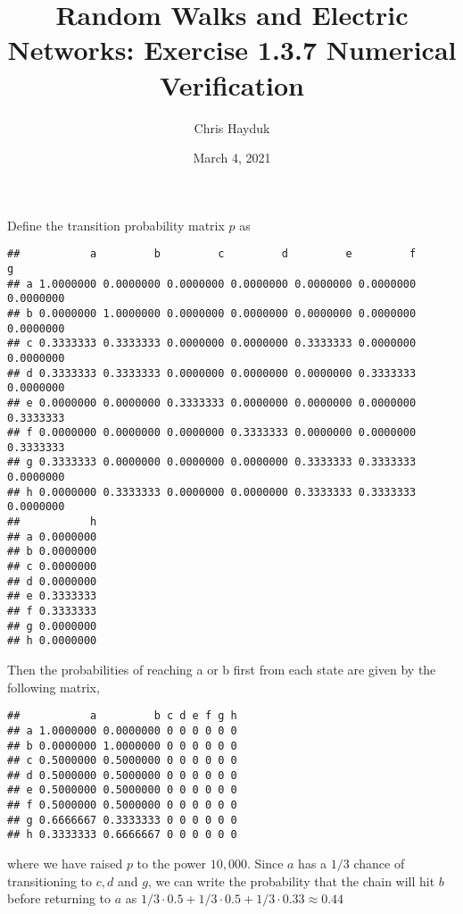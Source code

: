 \documentclass{article}\usepackage[]{graphicx}\usepackage[]{color}
\makeatletter
\newenvironment{kframe}{%
 \def\at@end@of@kframe{}%
 \ifinner\ifhmode%
  \def\at@end@of@kframe{\end{minipage}}%
  \begin{minipage}{\columnwidth}%
 \fi\fi%
 \def\FrameCommand##1{\hskip\@totalleftmargin \hskip-\fboxsep
 \colorbox{shadecolor}{##1}\hskip-\fboxsep
     \hskip-\linewidth \hskip-\@totalleftmargin \hskip\columnwidth}%
 \MakeFramed {\advance\hsize-\width
   \@totalleftmargin\z@ \linewidth\hsize
   \@setminipage}}%
 {\par\unskip\endMakeFramed%
 \at@end@of@kframe}
\newenvironment{knitrout}{}{} %
\makeatother
\begin{document}
\title{Random Walks and Electric Networks: Exercise 1.3.7 Numerical Verification}

\author{Chris Hayduk}
\date{March 4, 2021}

\maketitle



Define the transition probability matrix $p$ as

\begin{knitrout}
\color{fgcolor}\begin{kframe}
\begin{verbatim}
##           a         b         c         d         e         f         g
## a 1.0000000 0.0000000 0.0000000 0.0000000 0.0000000 0.0000000 0.0000000
## b 0.0000000 1.0000000 0.0000000 0.0000000 0.0000000 0.0000000 0.0000000
## c 0.3333333 0.3333333 0.0000000 0.0000000 0.3333333 0.0000000 0.0000000
## d 0.3333333 0.3333333 0.0000000 0.0000000 0.0000000 0.3333333 0.0000000
## e 0.0000000 0.0000000 0.3333333 0.0000000 0.0000000 0.0000000 0.3333333
## f 0.0000000 0.0000000 0.0000000 0.3333333 0.0000000 0.0000000 0.3333333
## g 0.3333333 0.0000000 0.0000000 0.0000000 0.3333333 0.3333333 0.0000000
## h 0.0000000 0.3333333 0.0000000 0.0000000 0.3333333 0.3333333 0.0000000
##           h
## a 0.0000000
## b 0.0000000
## c 0.0000000
## d 0.0000000
## e 0.3333333
## f 0.3333333
## g 0.0000000
## h 0.0000000
\end{verbatim}
\end{kframe}
\end{knitrout}

Then the probabilities of reaching a or b first from each state are given by the following matrix,
\begin{knitrout}
\color{fgcolor}\begin{kframe}
\begin{verbatim}
##           a         b c d e f g h
## a 1.0000000 0.0000000 0 0 0 0 0 0
## b 0.0000000 1.0000000 0 0 0 0 0 0
## c 0.5000000 0.5000000 0 0 0 0 0 0
## d 0.5000000 0.5000000 0 0 0 0 0 0
## e 0.5000000 0.5000000 0 0 0 0 0 0
## f 0.5000000 0.5000000 0 0 0 0 0 0
## g 0.6666667 0.3333333 0 0 0 0 0 0
## h 0.3333333 0.6666667 0 0 0 0 0 0
\end{verbatim}
\end{kframe}
\end{knitrout}

where we have raised $p$ to the power $10,000$. Since $a$ has a $1/3$ chance of transitioning to $c, d$ and $g$, we can write the probability that the chain will hit $b$ before returning to $a$ as $1/3 \cdot 0.5 + 1/3 \cdot 0.5 + 1/3 \cdot 0.33 \approx 0.44$
\end{document}

